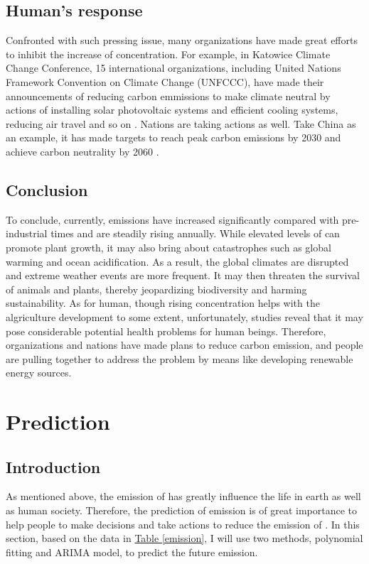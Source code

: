 \documentclass[12pt,a4paper]{article}
\begin{document}
    \subsection{Human's response}
    Confronted with such pressing issue, many organizations have made great efforts to inhibit the increase of  concentration. For example, in Katowice Climate Change Conference, 15 international organizations, including United Nations Framework Convention on Climate Change (UNFCCC), have made their announcements of reducing carbon emmissions to make climate neutral by actions of installing solar photovoltaic systems and efficient cooling systems, reducing air travel and so on \autocite{unfccc_15_2018}. Nations are taking actions as well. Take China as an example, it has made targets to reach peak carbon emissions by 2030 and achieve carbon neutrality by 2060 \autocite{xinhua_responding_2021}.
    
    \subsection{Conclusion}
    To conclude, currently,  emissions have increased significantly compared with pre-industrial times and are steadily rising annually. While elevated levels of  can promote plant growth, it may also bring about catastrophes such as global warming and ocean acidification. As a result, the global climates are disrupted and extreme weather events are more frequent. It may then threaten the survival of animals and plants, thereby jeopardizing biodiversity and harming sustainability. As for human, though rising  concentration helps with the algriculture development to some extent, unfortunately, studies reveal that it may pose considerable potential health problems for human beings. Therefore, organizations and nations have made plans to reduce carbon emission, and people are pulling together to address the problem by means like developing renewable energy sources.

    \section{Prediction}
    \subsection{Introduction}
    As mentioned above, the emission of  has greatly influence the life in earth as well as human society. Therefore, the prediction of  emission is of great importance to help people to make decisions and take actions to reduce the emission of . In this section, based on the data in \hyperref[emission]{Table \ref*{emission}}, I will use two methods, polynomial fitting and ARIMA model, to predict the future  emission.
\end{document}
